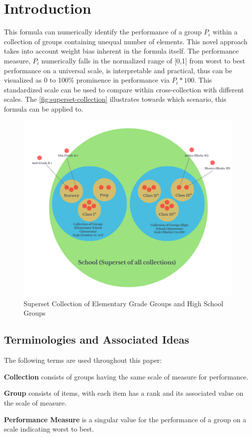 \documentclass[a4paper,fleqn,review]{cas-sc}
\begin{document}
\section{Introduction}
This formula can numerically identify the performance of a group $P_i$ within a collection of groups containing unequal number of elements. This novel approach takes into account weight bias inherent in the formula itself. The performance measure, $P_i$ numerically falls in the normalized range of [0,1] from worst to best performance on a universal scale, is interpretable and practical, thus can be visualized as 0 to 100\% prominence in performance via $P_i * 100$. This standardized scale can be used to compare within cross-collection with different scales. The \autoref{fig:superset-collection} illustrates towards which scenario, this formula can be applied to.
\begin{figure}
	\centering   
    \includegraphics [scale=0.5]{superset_collection.png}
    \caption{Superset Collection of Elementary Grade Groups and High School Groups}
    \label{fig:superset-collection}
\end{figure}

\subsection{Terminologies and Associated Ideas}
The following terms are used throughout this paper:
\begin{definition}
	\textbf{Collection} consists of groups having the same scale of measure for performance.
\end{definition}
\begin{definition}
	\textbf{Group} consists of items, with each item has a rank and its associated value on the scale of measure.
\end{definition}
\begin{definition}
	\textbf{Performance Measure} is a singular value for the performance of a group on a scale indicating worst to best.
\end{definition}
\end{document}
